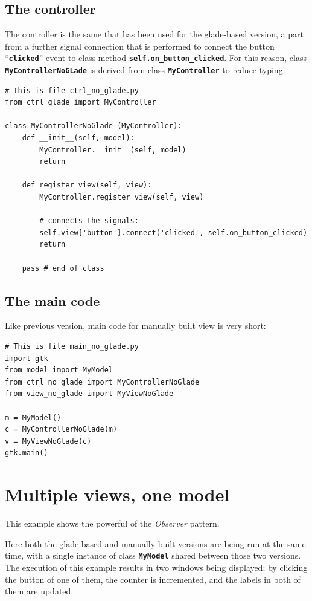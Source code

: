 \documentclass{article}
\newcommand{\kw}[1]{\emph{#1}\xspace}
\newcommand{\obs}{\kw{Observer} pattern\xspace}
\newcommand{\codename}[1]{\texttt{\bfseries \textcolor {codecolor}{#1}}\xspace}
\newcommand{\codesize}{\small } %
\begin{document}
\subsection{The controller}
The controller is the same that has been used for the glade-based
version, a part from a further signal connection that is performed to
connect the button ``\codename{clicked}'' event to class method
\codename{self.on\_button\_clicked}. For this reason, class
\codename{MyControllerNoGLade} is derived from class
\codename{MyController} to reduce typing.
 
{ \codesize 
\begin{verbatim}   
# This is file ctrl_no_glade.py
from ctrl_glade import MyController

class MyControllerNoGlade (MyController):
    def __init__(self, model):
        MyController.__init__(self, model)
        return

    def register_view(self, view):
        MyController.register_view(self, view)

        # connects the signals:
        self.view['button'].connect('clicked', self.on_button_clicked)
        return    
    
    pass # end of class
\end{verbatim}
} 


\subsection{The main code}
Like previous version, main code for manually built view is very
short:

{ \codesize 
\begin{verbatim}     
# This is file main_no_glade.py
import gtk
from model import MyModel
from ctrl_no_glade import MyControllerNoGlade
from view_no_glade import MyViewNoGlade

m = MyModel()
c = MyControllerNoGlade(m)
v = MyViewNoGlade(c)
gtk.main()
\end{verbatim}
} 

\section{Multiple views, one model}
This example shows the powerful of the \obs.

Here both the glade-based and manually built versions are being run at
the same time, with a single instance of class \codename{MyModel}
shared between those two versions. The execution of this example
results in two windows being displayed; by clicking the button of one
of them, the counter is incremented, and the labels in both of them
are updated.
\end{document}
